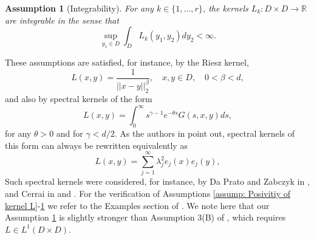\documentclass[12pt]{article}
\newtheorem{assumption}{Assumption}
\theoremstyle{definition}
\theoremstyle{remark}
\begin{document}
\begin{assumption}[Integrability]\label{assump: Integrability of kernel L} For any $k\in \{1,...,r\}$, the kernels $L_k: D\times D\rightarrow \mathbb R$ are integrable in the sense that
    \[
    \sup_{y_1\in D}\int_{D} L_k(y_1,y_2)dy_2<\infty.
    \]
\end{assumption}
\noindent 
These assumptions are satisfied, for instance, by the Riesz kernel,
\[
L(x,y) = \frac{1}{||x-y||_2^{\beta}},\quad x,y\in D, \quad 0<\beta<d,
\]
and also by spectral kernels of the form
\[
L(x,y) = \int_0^{\infty} s^{\gamma - 1}e^{-\theta s}G(s,x,y)ds,
\]
for any $\theta > 0$ and for $\gamma < d/2$. As the authors in \cite{salins2025nonexplosion} point out, spectral kernels of this form can always be rewritten equivalently as
\[
L(x,y) = \sum_{j=1}^{\infty} \lambda_j^2e_j(x)e_j(y),
\]
Such spectral kernels were considered, for instance, by Da Prato and  Zabczyk in \cite{da2014stochastic}, and Cerrai in \cite{cerrai2003stochastic} and \cite{cerrai2009khasminskii}. For the verification of Assumptions \ref{assump: Posivitiy of kernel L}-\ref{assump: Integrability of kernel L} we refer to the Examples section of \cite{salins2025nonexplosion}. We note here that our Assumption \ref{assump: Integrability of kernel L} is slightly stronger than Assumption 3(B) of \cite{salins2025nonexplosion}, which requires $L\in L^1(D\times D)$.
\end{document}
